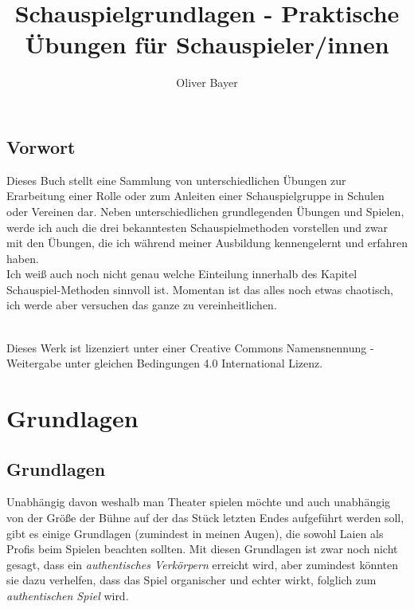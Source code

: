 \documentclass[ngerman, a4paper, twoside]{scrbook}%
\author{Oliver Bayer}
\title{Schauspielgrundlagen - Praktische Übungen für Schauspieler/innen}
\begin{document}
\frontmatter
\maketitle
\tableofcontents
	\chapter{Vorwort}
	Dieses Buch stellt eine Sammlung von unterschiedlichen Übungen zur Erarbeitung einer Rolle oder zum Anleiten einer Schauspielgruppe in Schulen oder Vereinen dar. Neben unterschiedlichen grundlegenden Übungen und Spielen, werde ich auch die drei bekanntesten Schauspielmethoden vorstellen und zwar mit den Übungen, die ich während meiner Ausbildung kennengelernt und erfahren haben.\\
	Ich weiß auch noch nicht genau welche Einteilung innerhalb des Kapitel Schauspiel-Methoden sinnvoll ist. Momentan ist das alles noch etwas chaotisch, ich werde aber versuchen das ganze zu vereinheitlichen.\\

	\vfill
	\begin{center}
		\ccbysa\\

		Dieses Werk ist lizenziert unter einer Creative Commons Namensnennung - Weitergabe unter gleichen Bedingungen 4.0 International Lizenz.
	\end{center}


	\mainmatter
	\part{Grundlagen}
	\chapter{Grundlagen}
	Unabhängig davon weshalb man Theater spielen möchte und auch unabhängig von der Größe der Bühne auf der das Stück letzten Endes aufgeführt werden soll, gibt es einige Grundlagen (zumindest in meinen Augen), die sowohl Laien als Profis beim Spielen beachten sollten. Mit diesen Grundlagen ist zwar noch nicht gesagt, dass ein \emph{authentisches Verkörpern}
	 erreicht wird, aber zumindest könnten sie dazu verhelfen, dass das Spiel organischer und echter wirkt, folglich zum \emph{authentischen Spiel} %
	 wird.
\end{document}
